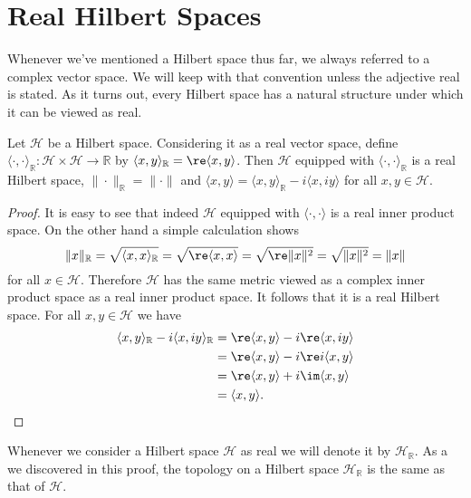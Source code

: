 \section{Real Hilbert Spaces}

Whenever we've mentioned a Hilbert space thus far, we always referred to a complex vector space. We will keep with that convention unless the adjective real is stated. As it turns out, every Hilbert space has a natural structure under which it can be viewed as real.

\begin{theorem}
Let $\mathcal{H}$ be a Hilbert space. Considering it as a real vector space, define $\langle \cdot,\cdot \rangle_\mathbb{R}:\mathcal{H}\times\mathcal{H}\rightarrow\mathbb{R}$ by $\langle x,y\rangle_\mathbb{R}=\re\langle x,y\rangle$. Then $\mathcal{H}$ equipped with $\langle\cdot,\cdot\rangle_\mathbb{R}$ is a real Hilbert space, $\|\cdot\|_\mathbb{R}=\|\cdot\|$ and $\langle x,y\rangle = \langle x,y\rangle_\mathbb{R}-i\langle x,iy\rangle$ for all $x,y\in\mathcal{H}$.
\end{theorem}

\begin{proof}
It is easy to see that indeed $\mathcal{H}$ equipped with $\langle\cdot,\cdot\rangle$ is a real inner product space. On the other hand a simple calculation shows
\begin{equation}
\|x\|_\mathbb{R}=\sqrt{\langle x,x\rangle_\mathbb{R}}=\sqrt{\re\langle x,x\rangle}=\sqrt{\re\|x\|^2}=\sqrt{\|x\|^2}=\|x\|
\end{equation}
for all $x\in\mathcal{H}$. Therefore $\mathcal{H}$ has the same metric viewed as a complex inner product space as a real inner product space. It follows that it is a real Hilbert space.
For all $x,y\in\mathcal{H}$ we have
\begin{align}
\begin{split}
\langle x,y\rangle_\mathbb{R}-i\langle x,iy \rangle_\mathbb{R}&= \re \langle x,y\rangle-i\re\langle x,iy \rangle \\
&= \re \langle x,y\rangle-i\re i\langle x,y \rangle \\
&= \re \langle x,y\rangle+i\im\langle x,y \rangle \\
&= \langle x,y\rangle.
\end{split} 
\end{align}
\end{proof}

Whenever we consider a Hilbert space $\mathcal{H}$ as real we will denote it by $\mathcal{H}_\mathbb{R}$. As a we discovered in this proof, the topology on a Hilbert space $\mathcal{H}_\mathbb{R}$ is the same as that of $\mathcal{H}$.

